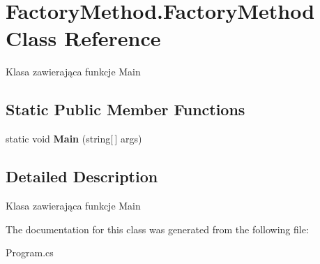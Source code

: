 \hypertarget{class_factory_method_1_1_factory_method}{}\section{Factory\+Method.\+Factory\+Method Class Reference}
\label{class_factory_method_1_1_factory_method}


Klasa zawierająca funkcje Main  


\subsection*{Static Public Member Functions}
\begin{DoxyCompactItemize}
\item 
\mbox{\label{class_factory_method_1_1_factory_method_a56c9c647f5dad0aeb51e21927aa4af85}} 
static void {\bfseries Main} (string\mbox{[}$\,$\mbox{]} args)
\end{DoxyCompactItemize}


\subsection{Detailed Description}
Klasa zawierająca funkcje Main 



The documentation for this class was generated from the following file\+:\begin{DoxyCompactItemize}
\item 
Program.\+cs\end{DoxyCompactItemize}
